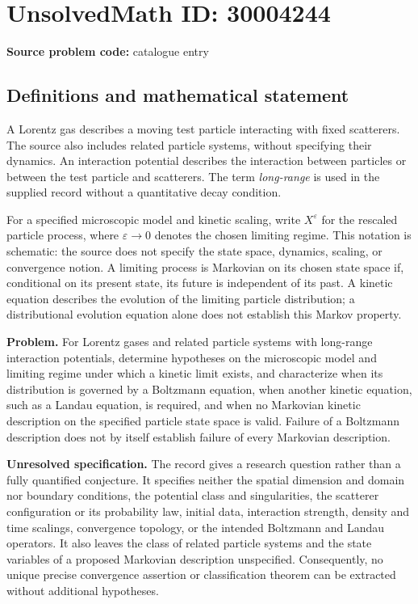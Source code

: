 \documentclass[11pt]{article}
\begin{document}
\section*{UnsolvedMath ID: 30004244}
\textbf{Source problem code:} catalogue entry
\subsection{Definitions and mathematical statement}
A Lorentz gas describes a moving test particle interacting with fixed scatterers. The source also includes related particle systems, without specifying their dynamics. An interaction potential describes the interaction between particles or between the test particle and scatterers. The term \emph{long-range} is used in the supplied record without a quantitative decay condition.

For a specified microscopic model and kinetic scaling, write \(X^\varepsilon\) for the rescaled particle process, where \(\varepsilon\to0\) denotes the chosen limiting regime. This notation is schematic: the source does not specify the state space, dynamics, scaling, or convergence notion. A limiting process is Markovian on its chosen state space if, conditional on its present state, its future is independent of its past. A kinetic equation describes the evolution of the limiting particle distribution; a distributional evolution equation alone does not establish this Markov property.

\textbf{Problem.} For Lorentz gases and related particle systems with long-range interaction potentials, determine hypotheses on the microscopic model and limiting regime under which a kinetic limit exists, and characterize when its distribution is governed by a Boltzmann equation, when another kinetic equation, such as a Landau equation, is required, and when no Markovian kinetic description on the specified particle state space is valid. Failure of a Boltzmann description does not by itself establish failure of every Markovian description.

\textbf{Unresolved specification.} The record gives a research question rather than a fully quantified conjecture. It specifies neither the spatial dimension and domain nor boundary conditions, the potential class and singularities, the scatterer configuration or its probability law, initial data, interaction strength, density and time scalings, convergence topology, or the intended Boltzmann and Landau operators. It also leaves the class of related particle systems and the state variables of a proposed Markovian description unspecified. Consequently, no unique precise convergence assertion or classification theorem can be extracted without additional hypotheses.
\end{document}
